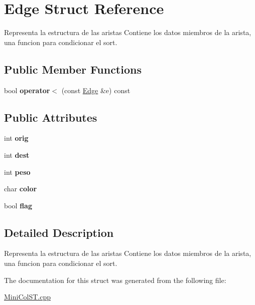 \hypertarget{structEdge}{}\section{Edge Struct Reference}
\label{structEdge}


Representa la estructura de las aristas  Contiene los datos miembros de la arista, una funcion para condicionar el sort.  


\subsection*{Public Member Functions}
\begin{DoxyCompactItemize}
\item 
\mbox{\label{structEdge_ac9199551fe9afee1b079b9d434068532}} 
bool {\bfseries operator$<$} (const \hyperlink{structEdge}{Edge} \&e) const
\end{DoxyCompactItemize}
\subsection*{Public Attributes}
\begin{DoxyCompactItemize}
\item 
\mbox{\label{structEdge_a7db302e155f6b91b908ee4ffd9d37331}} 
int {\bfseries orig}
\item 
\mbox{\label{structEdge_ad7df434ff7710e69f28bb31e91a35f82}} 
int {\bfseries dest}
\item 
\mbox{\label{structEdge_a95aba41a052cf8787107f8ca000fd8e6}} 
int {\bfseries peso}
\item 
\mbox{\label{structEdge_a7bdb4667054bb53fe27a9438bb6b2b42}} 
char {\bfseries color}
\item 
\mbox{\label{structEdge_a76d10f80be295bbdb4ff0a55839c31b0}} 
bool {\bfseries flag}
\end{DoxyCompactItemize}


\subsection{Detailed Description}
Representa la estructura de las aristas  Contiene los datos miembros de la arista, una funcion para condicionar el sort. 

The documentation for this struct was generated from the following file\+:\begin{DoxyCompactItemize}
\item 
\hyperlink{MiniColST_8cpp}{Mini\+Col\+S\+T.\+cpp}\end{DoxyCompactItemize}
